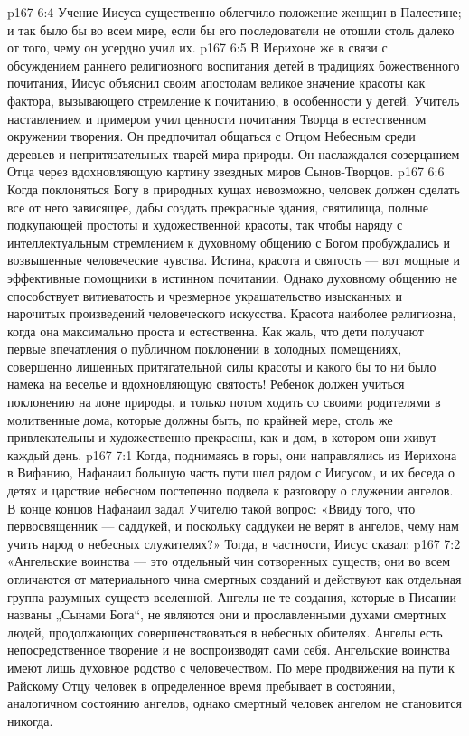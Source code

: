\vs p167 6:4 \pc Учение Иисуса существенно облегчило положение женщин в Палестине; и так было бы во всем мире, если бы его последователи не отошли столь далеко от того, чему он усердно учил их.
\vs p167 6:5 \pc В Иерихоне же в связи с обсуждением раннего религиозного воспитания детей в традициях божественного почитания, Иисус объяснил своим апостолам великое значение красоты как фактора, вызывающего стремление к почитанию, в особенности у детей. Учитель наставлением и примером учил ценности почитания Творца в естественном окружении творения. Он предпочитал общаться с Отцом Небесным среди деревьев и непритязательных тварей мира природы. Он наслаждался созерцанием Отца через вдохновляющую картину звездных миров Сынов\hyp{}Творцов.
\vs p167 6:6 Когда поклоняться Богу в природных кущах невозможно, человек должен сделать все от него зависящее, дабы создать прекрасные здания, святилища, полные подкупающей простоты и художественной красоты, так чтобы наряду с интеллектуальным стремлением к духовному общению с Богом пробуждались и возвышенные человеческие чувства. Истина, красота и святость --- вот мощные и эффективные помощники в истинном почитании. Однако духовному общению не способствует витиеватость и чрезмерное украшательство изысканных и нарочитых произведений человеческого искусства. Красота наиболее религиозна, когда она максимально проста и естественна. Как жаль, что дети получают первые впечатления о публичном поклонении в холодных помещениях, совершенно лишенных притягательной силы красоты и какого бы то ни было намека на веселье и вдохновляющую святость! Ребенок должен учиться поклонению на лоне природы, и только потом ходить со своими родителями в молитвенные дома, которые должны быть, по крайней мере, столь же привлекательны и художественно прекрасны, как и дом, в котором они живут каждый день.
\vs p167 7:1 Когда, поднимаясь в горы, они направлялись из Иерихона в Вифанию, Нафанаил большую часть пути шел рядом с Иисусом, и их беседа о детях и царствие небесном постепенно подвела к разговору о служении ангелов. В конце концов Нафанаил задал Учителю такой вопрос: «Ввиду того, что первосвященник --- саддукей, и поскольку саддукеи не верят в ангелов, чему нам учить народ о небесных служителях?» Тогда, в частности, Иисус сказал:
\vs p167 7:2 \pc «Ангельские воинства --- это отдельный чин сотворенных существ; они во всем отличаются от материального чина смертных созданий и действуют как отдельная группа разумных существ вселенной. Ангелы не те создания, которые в Писании названы „Сынами Бога“, не являются они и прославленными духами смертных людей, продолжающих совершенствоваться в небесных обителях. Ангелы есть непосредственное творение и не воспроизводят сами себя. Ангельские воинства имеют лишь духовное родство с человечеством. По мере продвижения на пути к Райскому Отцу человек в определенное время пребывает в состоянии, аналогичном состоянию ангелов, однако смертный человек ангелом не становится никогда.
